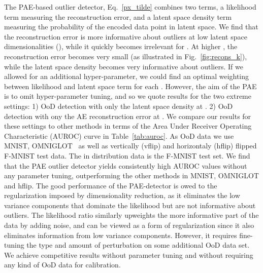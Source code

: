 \documentclass{article}
\begin{document}
The PAE-based outlier detector, Eq.~\ref{px_tilde} combines two terms, a likelihood term measuring the reconstruction error, and a latent space density term measuring the probability of the encoded data point in latent space. 
We find that the reconstruction error is more informative about outliers at low latent space dimensionalities (), while it quickly becomes irrelevant for . At higher , the reconstruction error becomes very small (as illustrated in Fig.~\ref{fig:recons_k}), while the latent space density becomes very informative about outliers. If we allowed for an additional hyper-parameter, we could find an optimal weighting between likelihood and latent space term for each . However, the aim of the PAE is to omit hyper-parameter tuning, and so we quote results for the two extreme settings: 1) OoD detection with only the latent space density at . 2) OoD detection with ony the AE reconstruction error at . We compare our results for these settings to other methods in terms of the Area Under Receiver Operating Characteristic (AUROC) curve in Table~\ref{tab:auroc}. As OoD data we use MNIST, OMNIGLOT~\citep{OMNIGLOT} as well as vertically (vflip) and horizontaly (hflip) flipped F-MNIST test data. The in distribution data is the F-MNIST test set.
We find that the PAE outlier detector yields consistently high AUROC values without any parameter tuning, outperforming the other methods in MNIST, OMNIGLOT and hflip.
The good performance of the PAE-detector is owed to the regularization imposed by dimensionality reduction, as it eliminates the low variance 
components that dominate the likelihood but 
are not informative about outliers.
The likelihood ratio \citep{LikelihoodRatioAI} similarly upweights the more informative part of the data by adding noise, and can be viewed as a form of regularization since it also eliminates information from low variance components. However, it requires fine-tuning the type and amount of perturbation on some additional OoD data set. We achieve competitive results without parameter tuning and without requiring any kind of OoD data for calibration.
\end{document}
